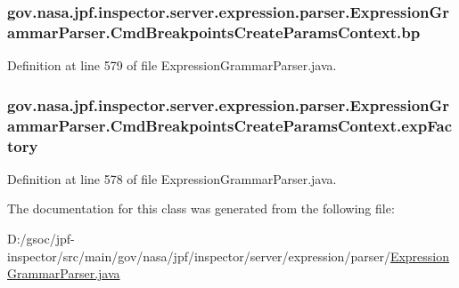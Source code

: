 \subsubsection[{\texorpdfstring{bp}{bp}}]{ gov.\+nasa.\+jpf.\+inspector.\+server.\+expression.\+parser.\+Expression\+Grammar\+Parser.\+Cmd\+Breakpoints\+Create\+Params\+Context.\+bp}\hypertarget{classgov_1_1nasa_1_1jpf_1_1inspector_1_1server_1_1expression_1_1parser_1_1_expression_grammar_pa40092569cc5b197b7a5caae27da04e05_a816b6582796d22fcbc57626c974cfc84}{}\label{classgov_1_1nasa_1_1jpf_1_1inspector_1_1server_1_1expression_1_1parser_1_1_expression_grammar_pa40092569cc5b197b7a5caae27da04e05_a816b6582796d22fcbc57626c974cfc84}


Definition at line 579 of file Expression\+Grammar\+Parser.\+java.

\subsubsection[{\texorpdfstring{exp\+Factory}{expFactory}}]{ gov.\+nasa.\+jpf.\+inspector.\+server.\+expression.\+parser.\+Expression\+Grammar\+Parser.\+Cmd\+Breakpoints\+Create\+Params\+Context.\+exp\+Factory}\hypertarget{classgov_1_1nasa_1_1jpf_1_1inspector_1_1server_1_1expression_1_1parser_1_1_expression_grammar_pa40092569cc5b197b7a5caae27da04e05_a793e80f9b9fc9776ffe215c2b57b09c5}{}\label{classgov_1_1nasa_1_1jpf_1_1inspector_1_1server_1_1expression_1_1parser_1_1_expression_grammar_pa40092569cc5b197b7a5caae27da04e05_a793e80f9b9fc9776ffe215c2b57b09c5}


Definition at line 578 of file Expression\+Grammar\+Parser.\+java.



The documentation for this class was generated from the following file\+:\begin{DoxyCompactItemize}
\item 
D\+:/gsoc/jpf-\/inspector/src/main/gov/nasa/jpf/inspector/server/expression/parser/\hyperlink{_expression_grammar_parser_8java}{Expression\+Grammar\+Parser.\+java}\end{DoxyCompactItemize}
